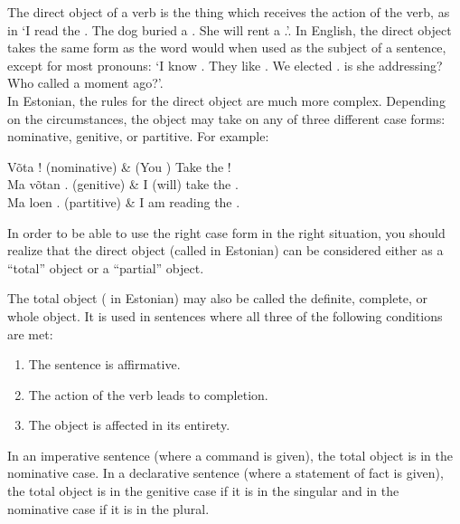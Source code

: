 \newLesson %

\Grammar %


\newSection The direct object of a verb is the thing which receives the action of the verb, as in `I read the . The dog buried a . She will rent a .'. In English, the direct object takes the same form as the word would when used as the subject of a sentence, except for most pronouns: `I know . They like . We elected .  is she addressing? Who called  a moment ago?'. \\

In Estonian, the rules for the direct object are much more complex. Depending on the circumstances, the object may take on any of three different case forms: nominative, genitive, or partitive. For example:

	\twoColumnsTable
	Võta ! \small{(nominative)} 		& (You \sing) Take the ! \\
	Ma võtan . \small{(genitive)}  &	I (will) take the . \\
	Ma loen . \small{(partitive)} &	I am reading the .
	\tableEnd

In order to be able to use the right case form in the right situation, you should realize that the direct object (called  in Estonian) can be considered either as a ``total'' object or a ``partial'' object.


\newSection The total object ( in Estonian) may also be called the definite, complete, or whole object. It is used in sentences where all three of the following conditions are met:

	\begin{enumerate}
	\item The sentence is affirmative.
	\item The action of the verb leads to completion.
	\item The object is affected in its entirety.
	\end{enumerate}

\newSection In an imperative sentence (where a command is given), the total object is in the nominative case. In a declarative sentence (where a statement of fact is given), the total object is in the genitive case if it is in the singular and in the nominative case if it is in the plural.

